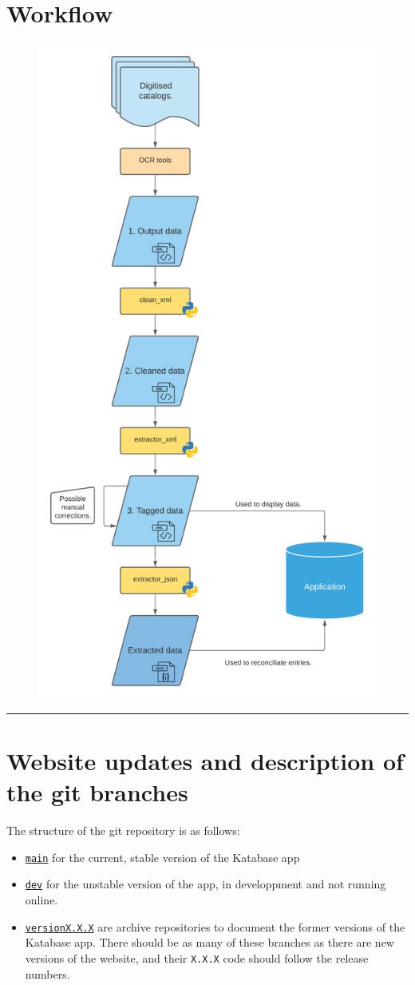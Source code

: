 \section*{Workflow}
\begin{figure}[h]
	\centering
	\includegraphics[height=\textwidth]{./annexes/workflow.png}
\end{figure}

\par\noindent\rule{\linewidth}{0.4pt}
\section*{Website updates and description of the git branches}

The structure of the git repository is as follows:

\begin{itemize}
\item \href{https://github.com/katabase/Application}{\texttt{main}} for the current, stable version of the Katabase app
\item \href{https://github.com/katabase/Application/tree/dev}{\texttt{dev}} for the unstable version of the app, in developpment and not running online.
\item \href{https://github.com/katabase/Application/tree/version1.0.0}{\texttt{versionX.X.X}} are archive repositories to document the former versions of the Katabase app. There should be as many of these branches as there are new versions of the website, and their \texttt{X.X.X} code should follow the release numbers. 
\end{itemize}

